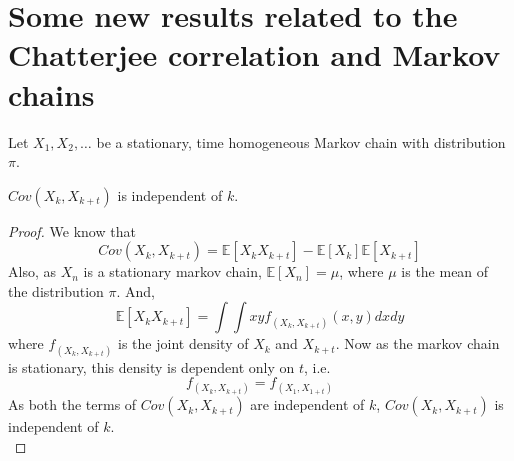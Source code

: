 \chapter{Some new results related to the Chatterjee correlation and Markov chains}

Let $X_1, X_2, \dots$ be a stationary, time homogeneous Markov chain with distribution $\pi$.
\begin{theorem}
    $Cov(X_k, X_{k+t})$ is independent of $k$.
    \begin{proof}
        We know that
        $$Cov(X_k, X_{k+t}) = \mathbb{E}[X_k X_{k+t}] - \mathbb{E}[X_k]\mathbb{E}[X_{k+t}]$$
        Also, as $X_n$ is a stationary markov chain, $\mathbb{E}[X_n] = \mu$, where $\mu$ is the mean of the distribution $\pi$.
        And,
        $$\mathbb{E}[X_k X_{k+t}] = \int\int xyf_{(X_k, X_{k+t})}(x, y)dxdy$$
        where $f_{(X_k, X_{k+t})}$ is the joint density of $X_k$ and $X_{k+t}$. Now as the markov chain is stationary, this density is dependent only on $t$, i.e. $$f_{(X_k, X_{k+t})} = f_{(X_1, X_{1+t})}$$
        As both the terms of $Cov(X_k, X_{k+t})$ are independent of $k$, $Cov(X_k, X_{k+t})$ is independent of $k$.\\
    \end{proof}
\end{theorem}

